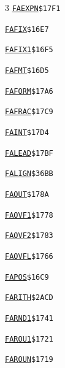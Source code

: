 \begin{multicols}{3}
\noindent\hyperlink{l:FAEXPN}{\texttt{FAEXPN}}\hfill\texttt{\$17F1~\phantom{000}\llap{\pageref{l:FAEXPN}}}\par
\noindent\hyperlink{l:FAFIX}{\texttt{FAFIX}}\hfill\texttt{\$16E7~\phantom{000}\llap{\pageref{l:FAFIX}}}\par
\noindent\hyperlink{l:FAFIX1}{\texttt{FAFIX1}}\hfill\texttt{\$16F5~\phantom{000}\llap{\pageref{l:FAFIX1}}}\par
\noindent\hyperlink{l:FAFMT}{\texttt{FAFMT}}\hfill\texttt{\$16D5~\phantom{000}\llap{\pageref{l:FAFMT}}}\par
\noindent\hyperlink{l:FAFORM}{\texttt{FAFORM}}\hfill\texttt{\$17A6~\phantom{000}\llap{\pageref{l:FAFORM}}}\par
\noindent\hyperlink{l:FAFRAC}{\texttt{FAFRAC}}\hfill\texttt{\$17C9~\phantom{000}\llap{\pageref{l:FAFRAC}}}\par
\noindent\hyperlink{l:FAINT}{\texttt{FAINT}}\hfill\texttt{\$17D4~\phantom{000}\llap{\pageref{l:FAINT}}}\par
\noindent\hyperlink{l:FALEAD}{\texttt{FALEAD}}\hfill\texttt{\$17BF~\phantom{000}\llap{\pageref{l:FALEAD}}}\par
\noindent\hyperlink{l:FALIGN}{\texttt{FALIGN}}\hfill\texttt{\$36BB~\phantom{000}\llap{\pageref{l:FALIGN}}}\par
\noindent\hyperlink{l:FAOUT}{\texttt{FAOUT}}\hfill\texttt{\$178A~\phantom{000}\llap{\pageref{l:FAOUT}}}\par
\noindent\hyperlink{l:FAOVF1}{\texttt{FAOVF1}}\hfill\texttt{\$1778~\phantom{000}\llap{\pageref{l:FAOVF1}}}\par
\noindent\hyperlink{l:FAOVF2}{\texttt{FAOVF2}}\hfill\texttt{\$1783~\phantom{000}\llap{\pageref{l:FAOVF2}}}\par
\noindent\hyperlink{l:FAOVFL}{\texttt{FAOVFL}}\hfill\texttt{\$1766~\phantom{000}\llap{\pageref{l:FAOVFL}}}\par
\noindent\hyperlink{l:FAPOS}{\texttt{FAPOS}}\hfill\texttt{\$16C9~\phantom{000}\llap{\pageref{l:FAPOS}}}\par
\noindent\hyperlink{l:FARITH}{\texttt{FARITH}}\hfill\texttt{\$2ACD~\phantom{000}\llap{\pageref{l:FARITH}}}\par
\noindent\hyperlink{l:FARND1}{\texttt{FARND1}}\hfill\texttt{\$1741~\phantom{000}\llap{\pageref{l:FARND1}}}\par
\noindent\hyperlink{l:FAROU1}{\texttt{FAROU1}}\hfill\texttt{\$1721~\phantom{000}\llap{\pageref{l:FAROU1}}}\par
\noindent\hyperlink{l:FAROUN}{\texttt{FAROUN}}\hfill\texttt{\$1719~\phantom{000}\llap{\pageref{l:FAROUN}}}\par

\end{multicols}
